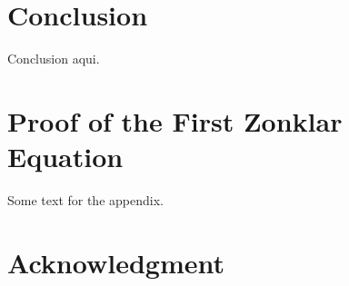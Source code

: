 \documentclass[journal]{IEEEtran}
\begin{document}



\section{Conclusion}
Conclusion aqui.






%


\appendices
\section{Proof of the First Zonklar Equation}
Some text for the appendix.

\section*{Acknowledgment}
\end{document}
